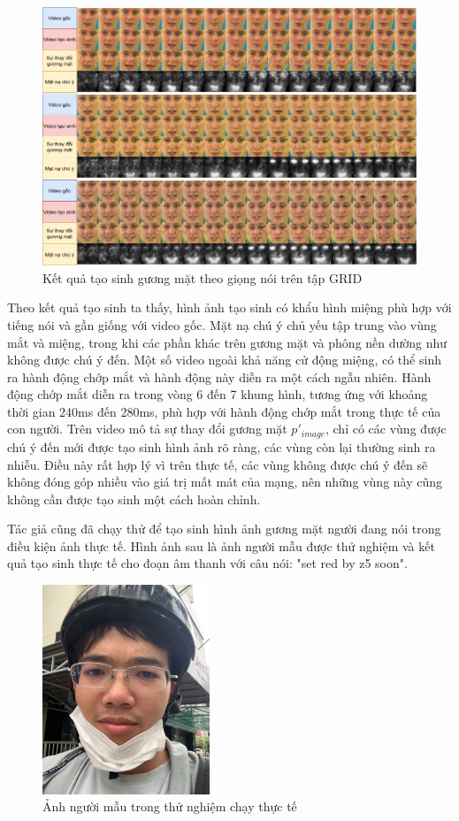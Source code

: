 \begin{figure}[H]
    \centering
    \includegraphics[width=15cm]{./content/materials/grid_examples-face.png}
    \caption{Kết quả tạo sinh gương mặt theo giọng nói trên tập GRID}
\end{figure}

Theo kết quả tạo sinh ta thấy, hình ảnh tạo sinh có khẩu hình miệng phù hợp với tiếng nói và gần giống với video gốc. Mặt nạ chú ý chủ yếu tập trung vào vùng mắt và miệng, trong khi các phần khác trên gương mặt và phông nền dường như không được chú ý đến. Một số video ngoài khả năng cử động miệng, có thể sinh ra hành động chớp mắt và hành động này diễn ra một cách ngẫu nhiên. Hành động chớp mắt diễn ra trong vòng 6 đến 7 khung hình, tương ứng với khoảng thời gian 240ms đến 280ms, phù hợp với hành động chớp mắt trong thực tế của con người. Trên video mô tả sự thay đổi gương mặt $p'_{image}$, chỉ có các vùng được chú ý đến mới được tạo sinh hình ảnh rõ ràng, các vùng còn lại thường sinh ra nhiễu. Điều này rất hợp lý vì trên thực tế, các vùng không được chú ý đến sẽ không đóng góp nhiều vào giá trị mất mát của mạng, nên những vùng này cũng không cần được tạo sinh một cách hoàn chỉnh.

Tác giả cũng đã chạy thử để tạo sinh hình ảnh gương mặt người đang nói trong điều kiện ảnh thực tế. Hình ảnh sau là ảnh người mẫu được thử nghiệm và kết quả tạo sinh thực tế cho đoạn âm thanh với câu nói: "set red by z5 soon".
\begin{figure}[H]
    \centering
    \includegraphics[width=5cm]{./content/materials/khang.png}
    \caption{Ảnh người mẫu trong thử nghiệm chạy thực tế}
\end{figure}

